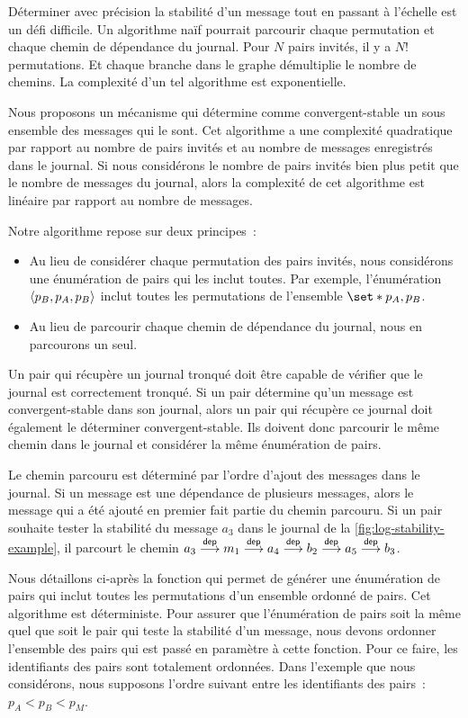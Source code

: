 Déterminer avec précision la stabilité d'un message tout en passant à l'échelle est un défi difficile.
Un algorithme naïf pourrait parcourir chaque permutation et chaque chemin de dépendance du journal.
Pour $N$ pairs invités, il y a $N!$ permutations.
Et chaque branche dans le graphe démultiplie le nombre de chemins.
La complexité d'un tel algorithme est exponentielle.

Nous proposons un mécanisme qui détermine comme convergent-stable un sous ensemble des messages qui le sont.
Cet algorithme a une complexité quadratique par rapport au nombre de pairs invités et au nombre de messages enregistrés dans le journal.
Si nous considérons le nombre de pairs invités bien plus petit que le nombre de messages du journal, alors la complexité de cet algorithme est linéaire par rapport au nombre de messages.

Notre algorithme repose sur deux principes~:
\begin{itemize}
    \item Au lieu de considérer chaque permutation des pairs invités, nous considérons une énumération de pairs qui les inclut toutes.
    Par exemple, l'énumération $\tuple*{p_B, p_A, p_B}$ inclut toutes les permutations de l'ensemble $\set*{p_A, p_B}$.
    \item Au lieu de parcourir chaque chemin de dépendance du journal, nous en parcourons un seul.
\end{itemize}

Un pair qui récupère un journal tronqué doit être capable de vérifier que le journal est correctement tronqué.
Si un pair détermine qu'un message est convergent-stable dans son journal, alors un pair qui récupère ce journal doit également le déterminer convergent-stable.
Ils doivent donc parcourir le même chemin dans le journal et considérer la même énumération de pairs.

Le chemin parcouru est déterminé par l'ordre d'ajout des messages dans le journal.
Si un message est une dépendance de plusieurs messages, alors le message qui a été ajouté en premier fait partie du chemin parcouru.
Si un pair souhaite tester la stabilité du message $a_3$ dans le journal de la \autoref{fig:log-stability-example}, il parcourt le chemin $a_3 \dep m_1 \dep a_4 \dep b_2 \dep a_5 \dep b_3$.

Nous détaillons ci-après la fonction qui permet de générer une énumération de pairs qui inclut toutes les permutations d'un ensemble ordonné de pairs.
Cet algorithme est déterministe.
Pour assurer que l'énumération de pairs soit la même quel que soit le pair qui teste la stabilité d'un message, nous devons ordonner l'ensemble des pairs qui est passé en paramètre à cette fonction.
Pour ce faire, les identifiants des pairs sont totalement ordonnées.
Dans l'exemple que nous considérons, nous supposons l'ordre suivant entre les identifiants des pairs~: $p_A < p_B < p_M$.

